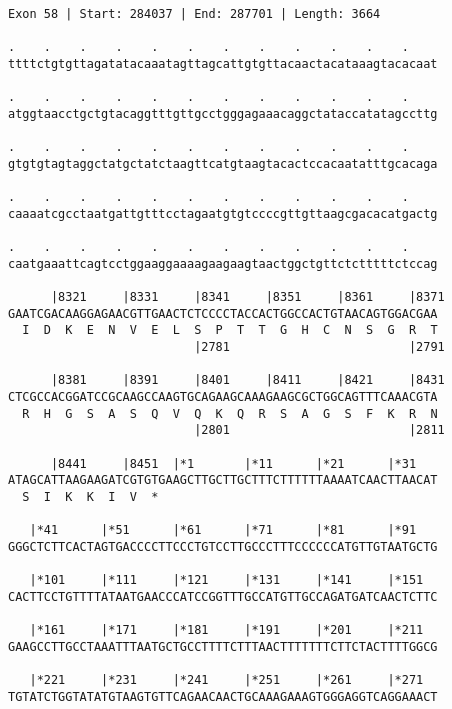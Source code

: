 \documentclass{article}
\begin{document}
\newpage
\begin{Verbatim}[fontfamily=courier]
Exon 58 | Start: 284037 | End: 287701 | Length: 3664

.    .    .    .    .    .    .    .    .    .    .    .    
ttttctgtgttagatatacaaatagttagcattgtgttacaactacataaagtacacaat

.    .    .    .    .    .    .    .    .    .    .    .    
atggtaacctgctgtacaggtttgttgcctgggagaaacaggctataccatatagccttg

.    .    .    .    .    .    .    .    .    .    .    .    
gtgtgtagtaggctatgctatctaagttcatgtaagtacactccacaatatttgcacaga

.    .    .    .    .    .    .    .    .    .    .    .    
caaaatcgcctaatgattgtttcctagaatgtgtccccgttgttaagcgacacatgactg

.    .    .    .    .    .    .    .    .    .    .    .    
caatgaaattcagtcctggaaggaaaagaagaagtaactggctgttctctttttctccag

      |8321     |8331     |8341     |8351     |8361     |8371
GAATCGACAAGGAGAACGTTGAACTCTCCCCTACCACTGGCCACTGTAACAGTGGACGAA
  I  D  K  E  N  V  E  L  S  P  T  T  G  H  C  N  S  G  R  T
                          |2781                         |2791

      |8381     |8391     |8401     |8411     |8421     |8431
CTCGCCACGGATCCGCAAGCCAAGTGCAGAAGCAAAGAAGCGCTGGCAGTTTCAAACGTA
  R  H  G  S  A  S  Q  V  Q  K  Q  R  S  A  G  S  F  K  R  N
                          |2801                         |2811

      |8441     |8451  |*1       |*11      |*21      |*31   
ATAGCATTAAGAAGATCGTGTGAAGCTTGCTTGCTTTCTTTTTTAAAATCAACTTAACAT
  S  I  K  K  I  V  *   

   |*41      |*51      |*61      |*71      |*81      |*91   
GGGCTCTTCACTAGTGACCCCTTCCCTGTCCTTGCCCTTTCCCCCCATGTTGTAATGCTG

   |*101     |*111     |*121     |*131     |*141     |*151  
CACTTCCTGTTTTATAATGAACCCATCCGGTTTGCCATGTTGCCAGATGATCAACTCTTC

   |*161     |*171     |*181     |*191     |*201     |*211  
GAAGCCTTGCCTAAATTTAATGCTGCCTTTTCTTTAACTTTTTTTCTTCTACTTTTGGCG

   |*221     |*231     |*241     |*251     |*261     |*271  
TGTATCTGGTATATGTAAGTGTTCAGAACAACTGCAAAGAAAGTGGGAGGTCAGGAAACT

\end{Verbatim}
\newpage
\end{document}
